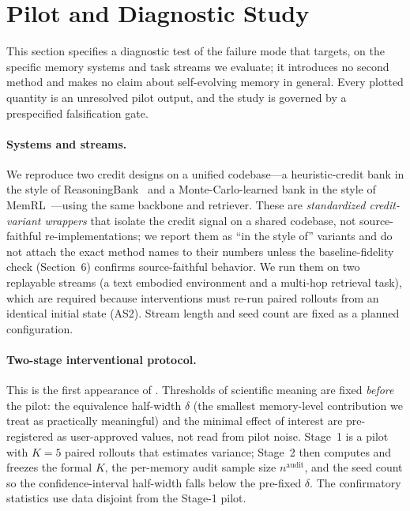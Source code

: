 \section{Pilot and Diagnostic Study}

This section specifies a diagnostic test of the failure mode that \method{}
targets, on the specific memory systems and task streams we evaluate; it introduces
no second method and makes no claim about self-evolving memory in general. Every
plotted quantity is an unresolved pilot output, and the study is governed by a
prespecified falsification gate.

\paragraph{Systems and streams.}
We reproduce two credit designs on a unified codebase---a heuristic-credit bank in
the style of ReasoningBank~ and a Monte-Carlo-learned
bank in the style of MemRL~---using the same backbone and
retriever. These are \emph{standardized credit-variant wrappers} that isolate the
credit signal on a shared codebase, not source-faithful re-implementations; we
report them as ``in the style of'' variants and do not attach the exact method names
to their numbers unless the baseline-fidelity check (Section~6) confirms
source-faithful behavior. We run them on two replayable streams (a text embodied
environment and a multi-hop retrieval task), which are required because
interventions must re-run paired rollouts from an identical initial state (AS2).
Stream length and seed count are fixed as a planned configuration.

\paragraph{Two-stage interventional protocol.}
This is the first appearance of \rit{}. Thresholds of scientific meaning are fixed
\emph{before} the pilot: the equivalence half-width $\delta$ (the smallest
memory-level contribution we treat as practically meaningful) and the minimal
effect of interest are pre-registered as user-approved values, not read from pilot
noise. Stage~1 is a pilot with $K=5$ paired rollouts that estimates variance;
Stage~2 then computes and freezes the formal $K$, the per-memory audit sample size
$n^{\text{audit}}$, and the seed count so the confidence-interval half-width falls
below the pre-fixed $\delta$. The confirmatory statistics use data disjoint from the
Stage-1 pilot.


